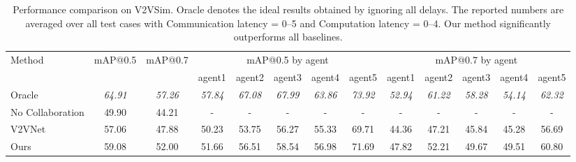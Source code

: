 \begin{table}[h]
\centering
\caption{Performance comparison on V2VSim. Oracle denotes the ideal results obtained by ignoring all delays. The reported numbers are averaged over all test cases with Communication latency = 0–5 and Computation latency = 0–4. Our method significantly outperforms all baselines.}

\begin{tabular}{l cc ccccc ccccc}
\toprule
Method & \multicolumn{1}{c}{mAP@0.5} & \multicolumn{1}{c}{mAP@0.7} &
\multicolumn{5}{c}{mAP@0.5 by agent} & \multicolumn{5}{c}{mAP@0.7 by agent} \\
\cmidrule(lr){4-8}\cmidrule(lr){9-13}
& & & agent1 & agent2 & agent3 & agent4 & agent5 & agent1 & agent2 & agent3 & agent4 & agent5 \\
\midrule
Oracle & \textit{64.91} & \textit{57.26} & \textit{57.84} & \textit{67.08} & \textit{67.99} & \textit{63.86} & \textit{73.92} & \textit{52.94} & \textit{61.22} & \textit{58.28} & \textit{54.14} & \textit{62.32} \\

No Collaboration  & 49.90 & 44.21  &- &- &- &- &- &- &- &- &- &-  \\
V2VNet & 57.06 & 47.88 & 50.23 & 53.75 & 56.27 & 55.33 & 69.71 & 44.36 & 47.21 & 45.84 & 45.28 & 56.69 \\
Ours        & 59.08 & 52.00 & 51.66 & 56.51 & 58.54 & 56.98 & 71.69 & 47.82 & 52.21 & 49.67 & 49.51 & 60.80 \\
\bottomrule
\end{tabular}
\label{tab:map-upper-lower}
\end{table}

